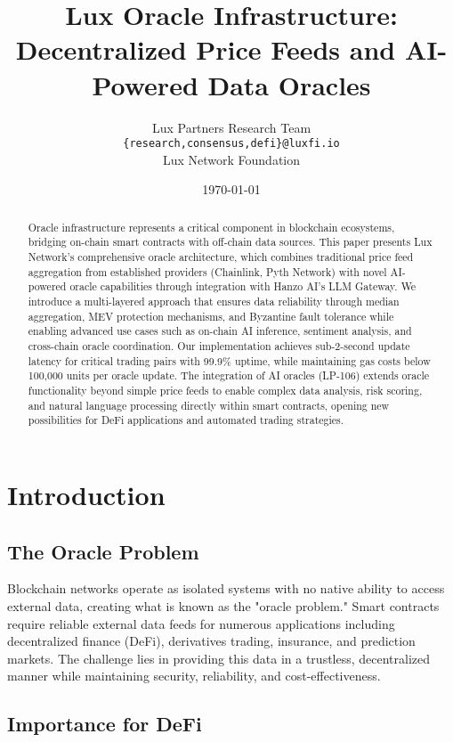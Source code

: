 \documentclass[11pt]{article}
\title{\textbf{Lux Oracle Infrastructure: Decentralized Price Feeds and AI-Powered Data Oracles}}
\author{
    Lux Partners Research Team\\
    \texttt{\{research,consensus,defi\}@luxfi.io}\\
    Lux Network Foundation\\
}
\date{\today}
\begin{document}
\maketitle

\begin{abstract}
Oracle infrastructure represents a critical component in blockchain ecosystems, bridging on-chain smart contracts with off-chain data sources. This paper presents Lux Network's comprehensive oracle architecture, which combines traditional price feed aggregation from established providers (Chainlink, Pyth Network) with novel AI-powered oracle capabilities through integration with Hanzo AI's LLM Gateway. We introduce a multi-layered approach that ensures data reliability through median aggregation, MEV protection mechanisms, and Byzantine fault tolerance while enabling advanced use cases such as on-chain AI inference, sentiment analysis, and cross-chain oracle coordination. Our implementation achieves sub-2-second update latency for critical trading pairs with 99.9\% uptime, while maintaining gas costs below 100,000 units per oracle update. The integration of AI oracles (LP-106) extends oracle functionality beyond simple price feeds to enable complex data analysis, risk scoring, and natural language processing directly within smart contracts, opening new possibilities for DeFi applications and automated trading strategies.
\end{abstract}

\section{Introduction}

\subsection{The Oracle Problem}

Blockchain networks operate as isolated systems with no native ability to access external data, creating what is known as the "oracle problem." Smart contracts require reliable external data feeds for numerous applications including decentralized finance (DeFi), derivatives trading, insurance, and prediction markets. The challenge lies in providing this data in a trustless, decentralized manner while maintaining security, reliability, and cost-effectiveness.

\subsection{Importance for DeFi}
\end{document}
